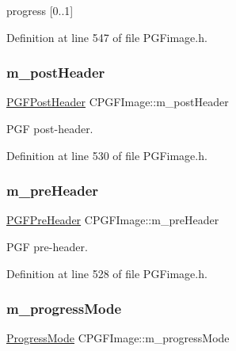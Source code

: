 progress \mbox{[}0..1\mbox{]} 



Definition at line 547 of file P\+G\+Fimage.\+h.

\mbox{\label{classCPGFImage_ab8635df22839ffb68bada53e38b9ce73}} 
\subsubsection{\texorpdfstring{m\_postHeader}{m\_postHeader}}
{\footnotesize\ttfamily \mbox{\hyperlink{structPGFPostHeader}{P\+G\+F\+Post\+Header}} C\+P\+G\+F\+Image\+::m\+\_\+post\+Header\hspace{0.3cm}{\ttfamily [protected]}}



P\+GF post-\/header. 



Definition at line 530 of file P\+G\+Fimage.\+h.

\mbox{\label{classCPGFImage_ad5ed0ec587742ebf46f72be4abde305d}} 
\subsubsection{\texorpdfstring{m\_preHeader}{m\_preHeader}}
{\footnotesize\ttfamily \mbox{\hyperlink{structPGFPreHeader}{P\+G\+F\+Pre\+Header}} C\+P\+G\+F\+Image\+::m\+\_\+pre\+Header\hspace{0.3cm}{\ttfamily [protected]}}



P\+GF pre-\/header. 



Definition at line 528 of file P\+G\+Fimage.\+h.

\mbox{\label{classCPGFImage_a8b4d6d5ef343f0f428b35c9bf1020569}} 
\subsubsection{\texorpdfstring{m\_progressMode}{m\_progressMode}}
{\footnotesize\ttfamily \mbox{\hyperlink{PGFtypes_8h_a04561479f4f8aa5a0775d8b541a1157e}{Progress\+Mode}} C\+P\+G\+F\+Image\+::m\+\_\+progress\+Mode\hspace{0.3cm}{\ttfamily [private]}}




